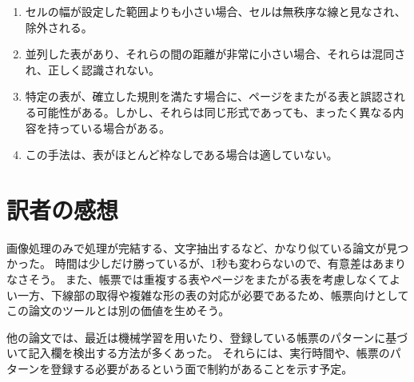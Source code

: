 \documentclass[uplatex, twocolumn,10pt]{jsarticle}
\begin{document}
\begin{enumerate}
    \item セルの幅が設定した範囲よりも小さい場合、セルは無秩序な線と見なされ、除外される。
    \item 並列した表があり、それらの間の距離が非常に小さい場合、それらは混同され、正しく認識されない。
    \item 特定の表が、確立した規則を満たす場合に、ページをまたがる表と誤認される可能性がある。しかし、それらは同じ形式であっても、まったく異なる内容を持っている場合がある。
    \item この手法は、表がほとんど枠なしである場合は適していない。
\end{enumerate}





\section{訳者の感想}
画像処理のみで処理が完結する、文字抽出するなど、かなり似ている論文が見つかった。
時間は少しだけ勝っているが、1秒も変わらないので、有意差はあまりなさそう。
また、帳票では重複する表やページをまたがる表を考慮しなくてよい一方、下線部の取得や複雑な形の表の対応が必要であるため、帳票向けとしてこの論文のツールとは別の価値を生めそう。

他の論文では、最近は機械学習を用いたり、登録している帳票のパターンに基づいて記入欄を検出する方法が多くあった。
それらには、実行時間や、帳票のパターンを登録する必要があるという面で制約があることを示す予定。
\end{document}
